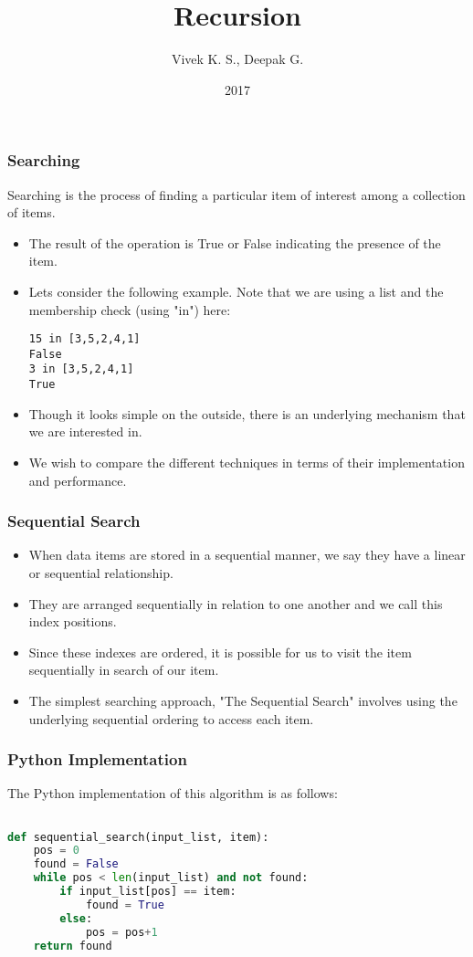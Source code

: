 \documentclass{beamer}
\title{Recursion}
\author{Vivek K. S., Deepak G.}
\institute{Information Systems Decision Sciences (ISDS)\\
MUMA College of Business\\
University of South Florida \\
Tampa, Florida}
\date{2017}
\begin{document}
\frame{\titlepage}

\begin{frame}[fragile]
\frametitle{Searching}
Searching is the process of finding a particular item of interest among a collection of items.
\begin{itemize}
\item The result of the operation is True or False indicating the presence of the item.
\item Lets consider the following example. Note that we are using a list and the membership check (using "in") here:
\begin{lstlisting}
15 in [3,5,2,4,1]
False
3 in [3,5,2,4,1]
True
\end{lstlisting}
\item Though it looks simple on the outside, there is an underlying mechanism that we are interested in.
\item We wish to compare the different techniques in terms of their implementation and performance.
\end{itemize}
\end{frame}


\begin{frame}[fragile]
\frametitle{Sequential Search}
\begin{itemize}
\item When data items are stored in a sequential manner, we say they have a linear or sequential relationship.
\item They are arranged sequentially in relation to one another and we call this index positions.
\item Since these indexes are ordered, it is possible for us to visit the item sequentially in search of our item.
\item The simplest searching approach, "The Sequential Search" involves using the underlying sequential ordering to access each item.
\end{itemize}
\end{frame}


\begin{frame}[fragile]
\frametitle{Python Implementation}
The Python implementation of this algorithm is as follows:
\begin{lstlisting}[language=Python]

def sequential_search(input_list, item):
    pos = 0
    found = False
    while pos < len(input_list) and not found:
        if input_list[pos] == item:
            found = True
        else:
            pos = pos+1
    return found
\end{lstlisting}
\end{frame}
\end{document}
